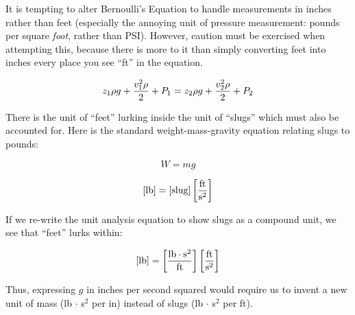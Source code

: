 \vskip 10pt

It is tempting to alter Bernoulli's Equation to handle measurements in inches rather than feet (especially the annoying unit of pressure measurement: pounds per square {\it foot}, rather than PSI).  However, caution must be exercised when attempting this, because there is more to it than simply converting feet into inches every place you see ``ft'' in the equation.

$$z_1 \rho g + {v_1^2 \rho \over 2} + P_1 = z_2 \rho g + {v_2^2 \rho \over 2} + P_2$$

There is the unit of ``feet'' lurking inside the unit of ``slugs'' which must also be accounted for.  Here is the standard weight-mass-gravity equation relating slugs to pounds:

$$W = mg$$

$$[\hbox{lb}] = [\hbox{slug}] \left[ \hbox{ft} \over \hbox{s}^2 \right]$$

If we re-write the unit analysis equation to show slugs as a compound unit, we see that ``feet'' lurks within:

$$[\hbox{lb}] = \left[{\hbox{lb} \cdot \hbox{s}^2} \over \hbox{ft}\right] \left[ \hbox{ft} \over \hbox{s}^2 \right]$$

Thus, expressing $g$ in inches per second squared would require us to invent a new unit of mass (lb $\cdot$ s$^{2}$ per in) instead of slugs (lb $\cdot$ s$^{2}$ per ft).











